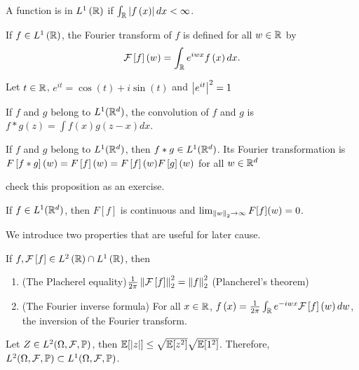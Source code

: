 \begin{definition} [$L^1\pa{\R}$ space]
    A function is in $L^1\pa{\R}$ if $\int_{\mathbb{R}} \left| f\left(x\right)\right|dx <\infty$.
\end{definition}
\begin{definition}
    If $f\in L^1\left(\mathbb{R}\right)$, the Fourier transform of $f$ is defined for all $w\in \mathbb{R}$ by
    \begin{equation*}
        \mathcal{F}\left[f\right]\left(w\right) = \int_{\mathbb{R}} e^{iwx} f\left(x\right)dx.
    \end{equation*}
\end{definition}
\begin{remark}
    Let $t\in \mathbb{R}$, $e^{it}=\cos(t)+i\sin(t)$ and $\left| e^{it}\right|^2=1$
\end{remark}
\begin{definition}[Convolution]
    If $f$ and $g$ belong to $L^1(\mathbb{R}^d)$, the convolution of $f$ and $g$ is $f\ast g(z)=\int f(x)g(z-x)dx$.
\end{definition}
\begin{proposition}
    If $f$ and $g$ belong to $L^1(\mathbb{R}^d)$, then $f\ast g \in L^1(\mathbb{R}^d)$. Its Fourier transformation is $F\left[f\ast g\right](w)=F\left[f\right](w)=F\left[f\right](w)F\left[g\right](w)$ for all $w\in \mathbb{R}^d$
\end{proposition}
\begin{remark}
    check this proposition as an exercise.
\end{remark}
\begin{proposition}
    If $f\in L^1(\mathbb{R}^d)$, then $F[f]$ is continuous and $\lim_{\left\| w \right\|_2 \to \infty} F[f](w)=0$.
\end{proposition}
We introduce two properties that are useful for later cause.
\begin{property}\label{prop:plancherel_inverse}
    If $f,\mathcal{F}\left[f\right]\in L^2\left(\mathbb{R}\right)\cap L^1\left(\mathbb{R}\right)$, then
    \begin{enumerate}
        \item (The Placherel equality)$\frac{1}{2\pi} \left\| \mathcal{F}\left[f\right] \right\|^2_2 = \left\| f \right\|^2_2$ (Plancherel's theorem)
        \item (The Fourier inverse formula) For all $x\in \mathbb{R}$, $f\left(x\right) = \frac{1}{2\pi} \int_{\mathbb{R}} e^{-iwx} \mathcal{F}\left[f\right]\left(w\right)dw$, the inversion of the Fourier transform.
    \end{enumerate}
\end{property}

\begin{question}
    Let $Z\in L^2(\Omega, \mathcal{F}, \mathbb{P})$, then $\mathbb{E} [\left| z\right|]\le\sqrt{\mathbb{E} [z^2]}\sqrt{\mathbb{E} [1^2]}$. Therefore, $L^2(\Omega, \mathcal{F}, \mathbb{P})\subset L^1(\Omega, \mathcal{F}, \mathbb{P})$.
\end{question}

